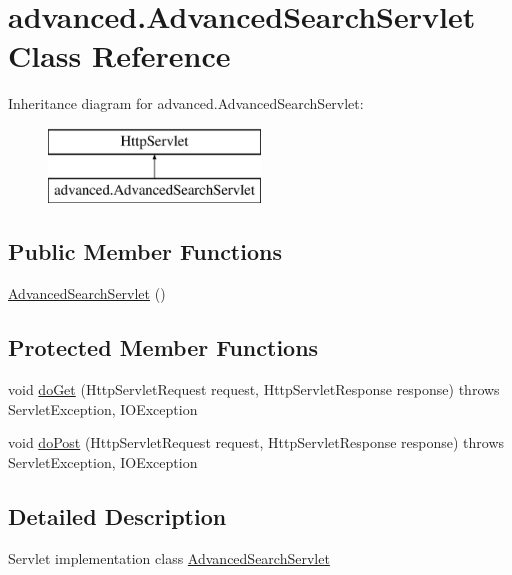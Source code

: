 \hypertarget{classadvanced_1_1_advanced_search_servlet}{}\section{advanced.\+Advanced\+Search\+Servlet Class Reference}
\label{classadvanced_1_1_advanced_search_servlet}
Inheritance diagram for advanced.\+Advanced\+Search\+Servlet\+:\begin{figure}[H]
\begin{center}
\leavevmode
\includegraphics[height=2.000000cm]{classadvanced_1_1_advanced_search_servlet}
\end{center}
\end{figure}
\subsection*{Public Member Functions}
\begin{DoxyCompactItemize}
\item 
\hyperlink{classadvanced_1_1_advanced_search_servlet_acdeda0b58a8e4e4cde7b4755141aa1f5}{Advanced\+Search\+Servlet} ()
\end{DoxyCompactItemize}
\subsection*{Protected Member Functions}
\begin{DoxyCompactItemize}
\item 
void \hyperlink{classadvanced_1_1_advanced_search_servlet_a63c9f9ecb57ff999b13b4ef46764fe39}{do\+Get} (Http\+Servlet\+Request request, Http\+Servlet\+Response response)  throws Servlet\+Exception, I\+O\+Exception 
\item 
void \hyperlink{classadvanced_1_1_advanced_search_servlet_add42de3b72bf474b9462538d39a4f346}{do\+Post} (Http\+Servlet\+Request request, Http\+Servlet\+Response response)  throws Servlet\+Exception, I\+O\+Exception 
\end{DoxyCompactItemize}


\subsection{Detailed Description}
Servlet implementation class \hyperlink{classadvanced_1_1_advanced_search_servlet}{Advanced\+Search\+Servlet} 

